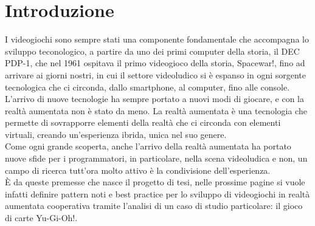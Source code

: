 \chapter{Introduzione}\label{chap:Introduzione}

I videogiochi sono sempre stati una componente fondamentale che accompagna lo 
sviluppo teconologico, a partire da uno dei primi computer della storia, il DEC PDP-1,
che nel 1961 ospitava il primo videogioco della storia, Spacewar!, fino ad arrivare
ai giorni nostri, in cui il settore videoludico si è espanso in ogni sorgente tecnologica
che ci circonda, dallo smartphone, al computer, fino alle console.\\
L'arrivo di nuove tecnologie ha sempre portato a nuovi modi di giocare, e con la 
realtà aumentata non è stato da meno. La realtà aumentata è una tecnologia che permette di sovrapporre elementi della
realtà che ci circonda con elementi virtuali, creando un'esperienza ibrida, unica
nel suo genere.\\
Come ogni grande scoperta, anche l'arrivo della realtà aumentata ha portato nuove
sfide per i programmatori, in particolare, nella scena videoludica e non, un campo 
di ricerca tutt'ora molto attivo è la condivisione dell'esperienza.\\
È da queste premesse che nasce il progetto di tesi, nelle prossime
pagine si vuole infatti definire pattern noti e best practice per lo sviluppo di 
videogiochi in realtà aumentata cooperativa tramite l'analisi di un caso di studio
particolare: il gioco di carte Yu-Gi-Oh!.\\
\\
